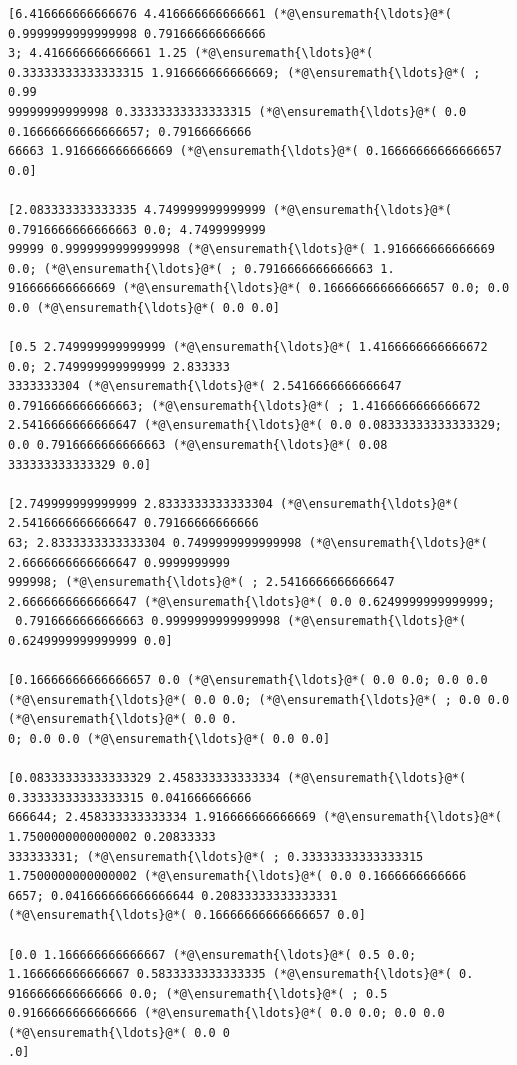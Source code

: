 \documentclass[12pt,a4paper]{article}
\begin{document}
\begin{lstlisting}
[6.416666666666676 4.416666666666661 (*@\ensuremath{\ldots}@*( 0.9999999999999998 0.791666666666666
3; 4.416666666666661 1.25 (*@\ensuremath{\ldots}@*( 0.33333333333333315 1.916666666666669; (*@\ensuremath{\ldots}@*( ; 0.99
99999999999998 0.33333333333333315 (*@\ensuremath{\ldots}@*( 0.0 0.16666666666666657; 0.79166666666
66663 1.916666666666669 (*@\ensuremath{\ldots}@*( 0.16666666666666657 0.0]

[2.083333333333335 4.749999999999999 (*@\ensuremath{\ldots}@*( 0.7916666666666663 0.0; 4.7499999999
99999 0.9999999999999998 (*@\ensuremath{\ldots}@*( 1.916666666666669 0.0; (*@\ensuremath{\ldots}@*( ; 0.7916666666666663 1.
916666666666669 (*@\ensuremath{\ldots}@*( 0.16666666666666657 0.0; 0.0 0.0 (*@\ensuremath{\ldots}@*( 0.0 0.0]

[0.5 2.749999999999999 (*@\ensuremath{\ldots}@*( 1.4166666666666672 0.0; 2.749999999999999 2.833333
3333333304 (*@\ensuremath{\ldots}@*( 2.5416666666666647 0.7916666666666663; (*@\ensuremath{\ldots}@*( ; 1.4166666666666672 
2.5416666666666647 (*@\ensuremath{\ldots}@*( 0.0 0.08333333333333329; 0.0 0.7916666666666663 (*@\ensuremath{\ldots}@*( 0.08
333333333333329 0.0]

[2.749999999999999 2.8333333333333304 (*@\ensuremath{\ldots}@*( 2.5416666666666647 0.79166666666666
63; 2.8333333333333304 0.7499999999999998 (*@\ensuremath{\ldots}@*( 2.6666666666666647 0.9999999999
999998; (*@\ensuremath{\ldots}@*( ; 2.5416666666666647 2.6666666666666647 (*@\ensuremath{\ldots}@*( 0.0 0.6249999999999999;
 0.7916666666666663 0.9999999999999998 (*@\ensuremath{\ldots}@*( 0.6249999999999999 0.0]

[0.16666666666666657 0.0 (*@\ensuremath{\ldots}@*( 0.0 0.0; 0.0 0.0 (*@\ensuremath{\ldots}@*( 0.0 0.0; (*@\ensuremath{\ldots}@*( ; 0.0 0.0 (*@\ensuremath{\ldots}@*( 0.0 0.
0; 0.0 0.0 (*@\ensuremath{\ldots}@*( 0.0 0.0]

[0.08333333333333329 2.458333333333334 (*@\ensuremath{\ldots}@*( 0.33333333333333315 0.041666666666
666644; 2.458333333333334 1.916666666666669 (*@\ensuremath{\ldots}@*( 1.7500000000000002 0.20833333
333333331; (*@\ensuremath{\ldots}@*( ; 0.33333333333333315 1.7500000000000002 (*@\ensuremath{\ldots}@*( 0.0 0.1666666666666
6657; 0.041666666666666644 0.20833333333333331 (*@\ensuremath{\ldots}@*( 0.16666666666666657 0.0]

[0.0 1.166666666666667 (*@\ensuremath{\ldots}@*( 0.5 0.0; 1.166666666666667 0.5833333333333335 (*@\ensuremath{\ldots}@*( 0.
9166666666666666 0.0; (*@\ensuremath{\ldots}@*( ; 0.5 0.9166666666666666 (*@\ensuremath{\ldots}@*( 0.0 0.0; 0.0 0.0 (*@\ensuremath{\ldots}@*( 0.0 0
.0]


\end{lstlisting}
\end{document}
